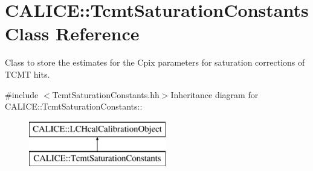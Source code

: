 \section{CALICE::TcmtSaturationConstants Class Reference}
\label{classCALICE_1_1TcmtSaturationConstants}


Class to store the estimates for the Cpix parameters for saturation corrections of TCMT hits.  


{\ttfamily \#include $<$TcmtSaturationConstants.hh$>$}Inheritance diagram for CALICE::TcmtSaturationConstants::\begin{figure}[H]
\begin{center}
\leavevmode
\includegraphics[height=2cm]{classCALICE_1_1TcmtSaturationConstants}
\end{center}
\end{figure}
